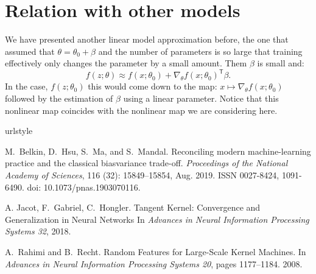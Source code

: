 \documentclass[a4paper,10pt]{article}
\newcommand{\trnsp}{\mathsf{T}}
\begin{document}
\section{Relation with other models}
We have presented another linear model approximation before, the one that assumed that $\theta  = \theta_0 + \beta$ and the number of parameters is so large that training effectively only changes the parameter by a small amount. Them $\beta$ is small and:
\begin{equation*}
f(z; \theta) \approx  f(x; \theta_0) + \nabla_\theta f(x; \theta_0)^\trnsp\beta.
\end{equation*}
In the case,  $f(z; \theta_0)$ this would come down to the map: $x \mapsto  \nabla_\theta  f(x; \theta_0)$ followed by the estimation of $\beta$ using a linear parameter. Notice that this nonlinear map coincides with the nonlinear map we are considering here.





\begin{thebibliography}{2}
\providecommand{\natexlab}[1]{#1}
\providecommand{\url}[1]{\texttt{#1}}
\expandafter\ifx\csname urlstyle\endcsname\relax
  \providecommand{\doi}[1]{doi: #1}\else
  \providecommand{\doi}{doi: \begingroup \urlstyle{rm}\Url}\fi

M.~Belkin, D.~Hsu, S.~Ma, and S.~Mandal.
\newblock Reconciling modern machine-learning practice and the classical
  bias\textendash variance trade-off.
\newblock \emph{Proceedings of the National Academy of Sciences}, 116
  (32): 15849--15854, Aug. 2019.
\newblock ISSN 0027-8424, 1091-6490.
\newblock \doi{10.1073/pnas.1903070116}.


A. Jacot, F.~Gabriel, C.~Hongler.
 {{Tangent}} {{Kernel}}: {{Convergence}} and {{Generalization}} in {{Neural}} {{Networks}}
\newblock In \emph{Advances in {{Neural Information Processing Systems}} 32},
  2018.

A.~Rahimi and B.~Recht.
\newblock Random {{Features}} for {{Large}}-{{Scale Kernel Machines}}.
\newblock In \emph{Advances in {{Neural Information Processing Systems}} 20},
  pages 1177--1184. 2008.

  
\end{thebibliography}
\end{document}
